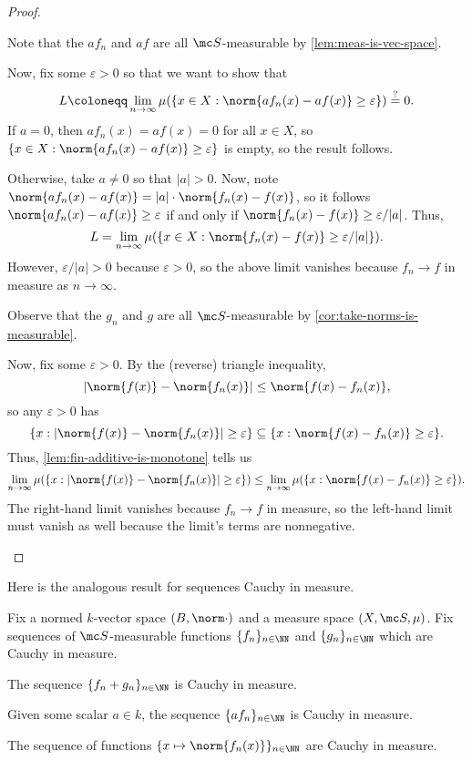 \documentclass[../notes.tex]{subfiles}
\begin{document}
\begin{proof}
\begin{listalph}
		\item Note that the $af_n$ and $af$ are all $\mc S$-measurable by \autoref{lem:meas-is-vec-space}.
		
		Now, fix some $\varepsilon>0$ so that we want to show that
		\[L\coloneqq\lim_{n\to\infty}\mu(\{x\in X:\norm{af_n(x)-af(x)}\ge\varepsilon\})\stackrel?=0.\]
		If $a=0$, then $af_n(x)=af(x)=0$ for all $x\in X$, so $\{x\in X:\norm{af_n(x)-af(x)}\ge\varepsilon\}$ is empty, so the result follows.

		Otherwise, take $a\ne0$ so that $|a|>0$. Now, note $\norm{af_n(x)-af(x)}=|a|\cdot\norm{f_n(x)-f(x)}$, so it follows $\norm{af_n(x)-af(x)}\ge\varepsilon$ if and only if $\norm{f_n(x)-f(x)}\ge\varepsilon/|a|$. Thus,
		\[L=\lim_{n\to\infty}\mu(\{x\in X:\norm{f_n(x)-f(x)}\ge\varepsilon/|a|\}).\]
		However, $\varepsilon/|a|>0$ because $\varepsilon>0$, so the above limit vanishes because $f_n\to f$ in measure as $n\to\infty$.

		\item Observe that the $g_n$ and $g$ are all $\mc S$-measurable by \autoref{cor:take-norms-is-measurable}.

		Now, fix some $\varepsilon>0$. By the (reverse) triangle inequality,
		\[|\norm{f(x)}-\norm{f_n(x)}|\le\norm{f(x)-f_n(x)},\]
		so any $\varepsilon>0$ has
		\[\{x:|\norm{f(x)}-\norm{f_n(x)}|\ge\varepsilon\}\subseteq\{x:\norm{f(x)-f_n(x)}\ge\varepsilon\}.\]
		Thus, \autoref{lem:fin-additive-is-monotone} tells us
		\[\lim_{n\to\infty}\mu(\{x:|\norm{f(x)}-\norm{f_n(x)}|\ge\varepsilon\})\le\lim_{n\to\infty}\mu(\{x:\norm{f(x)-f_n(x)}\ge\varepsilon\}).\]
		The right-hand limit vanishes because $f_n\to f$ in measure, so the left-hand limit must vanish as well because the limit's terms are nonnegative.
		\qedhere
	\end{listalph}
\end{proof}
Here is the analogous result for sequences Cauchy in measure.
\begin{lemma}
	Fix a normed $k$-vector space $(B,\norm\cdot)$ and a measure space $(X,\mc S,\mu)$. Fix sequences of $\mc S$-measurable functions $\{f_n\}_{n\in\NN}$ and $\{g_n\}_{n\in\NN}$ which are Cauchy in measure.
	\begin{listalph}
		\item The sequence $\{f_n+g_n\}_{n\in\NN}$ is Cauchy in measure.
		\item Given some scalar $a\in k$, the sequence $\{af_n\}_{n\in\NN}$ is Cauchy in measure.
		\item The sequence of functions $\{x\mapsto\norm{f_n(x)}\}_{n\in\NN}$ are Cauchy in measure.
	\end{listalph}
\end{lemma}
\end{document}
